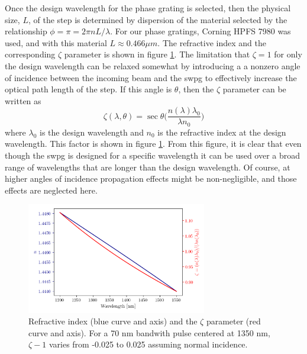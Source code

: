 Once the design wavelength for the phase grating is selected, then the physical size, $L$, of the step is determined by dispersion of the material selected by the relationship $\phi=\pi=2\pi n L/\lambda$.  For our phase gratings, Corning HPFS 7980 was used, and with this material $L\approx0.466\mu m$.  The refractive index and the corresponding $\zeta$ parameter is shown in figure \ref{fig:n_zeta}. The limitation that $\zeta=1$ for only the design wavelength can be relaxed somewhat by introducing a a nonzero angle of incidence between the incoming beam and the \gls{swpg} to effectively increase the optical path length of the step.  If this angle is $\theta$, then the $\zeta$ parameter can be written as
\begin{equation}
\label{eqn:zeta_theta}
	\zeta(\lambda,\theta)=\sec\theta\bigg(  \frac{n(\lambda)\lambda_0}{\lambda n_0} \bigg)
\end{equation}
where $\lambda_0$ is the design wavelength and $n_0$ is the refractive index at the design wavelength.  This factor is shown in figure \ref{fig:n_zeta}.  From this figure, it is clear that even though the \gls{swpg} is designed for a specific wavelength it can be used over a broad range of wavelengths that are longer than the design wavelength. Of course, at higher angles of incidence propagation effects might be non-negligible, and those effects are neglected here. 
\begin{figure}
	\centering
	\includegraphics[width=0.7\textwidth]{figures/Two_source/n_zeta.png}
	\caption{Refractive index (blue curve and axis) and the $\zeta$ parameter (red curve and axis).  For a 70 nm bandwith pulse centered at 1350 nm, $\zeta - 1$ varies from -0.025 to 0.025 assuming normal incidence.}
	\label{fig:n_zeta}
\end{figure}

